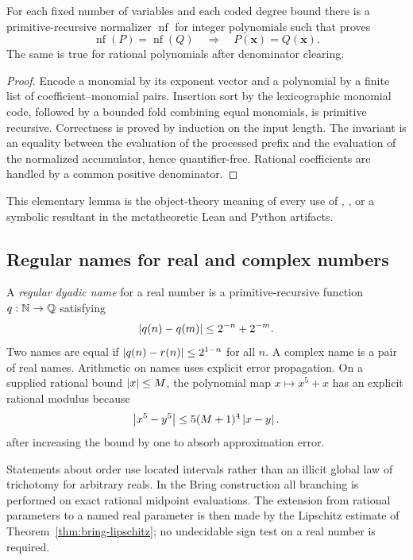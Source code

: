 \begin{lemma}\label{lem:poly-normalize}
For each fixed number of variables and each coded degree bound there is a
primitive-recursive normalizer \(\operatorname{nf}\) for integer polynomials
such that \ipra{} proves
\[
 \operatorname{nf}(P)=\operatorname{nf}(Q)
 \quad\Longrightarrow\quad
 P(\mathbf x)=Q(\mathbf x).
\]
The same is true for rational polynomials after denominator clearing.
\end{lemma}

\begin{proof}
Encode a monomial by its exponent vector and a polynomial by a finite list of
coefficient--monomial pairs.  Insertion sort by the lexicographic monomial code,
followed by a bounded fold combining equal monomials, is primitive recursive.
Correctness is proved by induction on the input length.  The invariant is an
equality between the evaluation of the processed prefix and the evaluation of
the normalized accumulator, hence quantifier-free.  Rational coefficients are
handled by a common positive denominator.
\end{proof}

This elementary lemma is the object-theory meaning of every use of
, , or a symbolic resultant in the metatheoretic
Lean and Python artifacts.

\subsection{Regular names for real and complex numbers}

A \emph{regular dyadic name} for a real number is a primitive-recursive
function \(q:\mathbb N\to\mathbb Q\) satisfying
\begin{equation}\label{eq:regular-name}
  \left|q(n)-q(m)\right|\le 2^{-n}+2^{-m}.
\end{equation}
Two names are equal if
\(\left|q(n)-r(n)\right|\le 2^{1-n}\) for all \(n\).  A complex name is a pair of real
names.  Arithmetic on names uses explicit error propagation.  On a supplied
rational bound \(\left|x\right|\le M\), the polynomial map \(x\mapsto x^5+x\) has an
explicit rational modulus because
\[
 \left|x^5-y^5\right|
 \le 5(M+1)^4\left|x-y\right|.
\]
after increasing the bound by one to absorb approximation error.

Statements about order use located intervals rather than an illicit global law
of trichotomy for arbitrary reals.  In the Bring construction all branching is
performed on exact rational midpoint evaluations.  The extension from rational
parameters to a named real parameter is then made by the Lipschitz estimate of
Theorem~\ref{thm:bring-lipschitz}; no undecidable sign test on a real number is
required.

